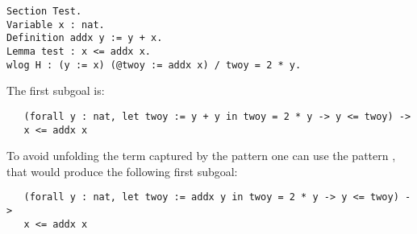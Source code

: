 \begin{lstlisting}
Section Test.
Variable x : nat.
Definition addx y := y + x.
Lemma test : x <= addx x.
wlog H : (y := x) (@twoy := addx x) / twoy = 2 * y.
\end{lstlisting}
\noindent
The first subgoal is:
\begin{lstlisting}
   (forall y : nat, let twoy := y + y in twoy = 2 * y -> y <= twoy) ->
   x <= addx x
\end{lstlisting}
\noindent
To avoid unfolding the term captured by the pattern  one
can use the pattern , that would produce the following first
subgoal:
\begin{lstlisting}
   (forall y : nat, let twoy := addx y in twoy = 2 * y -> y <= twoy) ->
   x <= addx x
\end{lstlisting}
